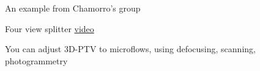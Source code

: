 
    
\begin{frame}[label=app-8]{An example from Chamorro's group}
    \centering{}
\end{frame}
    
\begin{frame}[label=app-9]{Four view splitter \href{https://www.dropbox.com/s/h6g8d373lxgkqv8/Video1a.mp4?raw=1}{video}}
    \centering{}
\end{frame}
    

\begin{frame}[label=app-10b]{You can adjust 3D-PTV to microflows, using defocusing, scanning, photogrammetry}
\begin{center}
\begin{columns}
\end{columns}
\end{center}
\end{frame}


